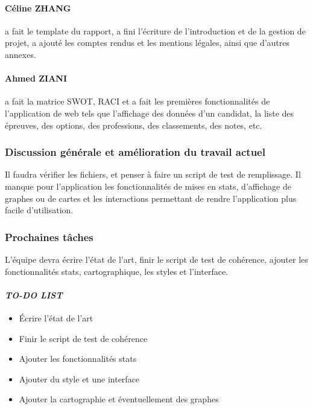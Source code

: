\paragraph{Céline ZHANG} a fait le template du rapport, a fini l'écriture de l'introduction et de la gestion de projet, a ajouté les comptes rendus et les mentions légales, ainsi que d'autres annexes.
\paragraph{Ahmed ZIANI} a fait la matrice \textsf{SWOT}, \textsf{RACI} et a fait les premières fonctionnalités de l'application de web tels que l'affichage des données d'un candidat, la liste des épreuves, des options, des professions, des classements, des notes, etc.

\subsubsection*{Discussion générale et amélioration du travail actuel}
Il faudra vérifier les fichiers, et penser à faire un script de test de remplissage. Il manque pour l'application les fonctionnalités de mises en stats, d'affichage de graphes ou de cartes et les interactions permettant de rendre l'application plus facile d'utilisation. 

\subsubsection*{Prochaines tâches}
L'équipe devra écrire l'état de l'art, finir le script de test de cohérence, ajouter les fonctionnalités stats, cartographique, les styles et l'interface.


\paragraph{\emph{TO-DO LIST}}
\begin{itemize}
    \item Écrire l'état de l'art
    \item Finir le script de test de cohérence
    \item Ajouter les fonctionnalités stats
    \item Ajouter du style et une interface
    \item Ajouter la cartographie et éventuellement des graphes
    
\end{itemize}


% 